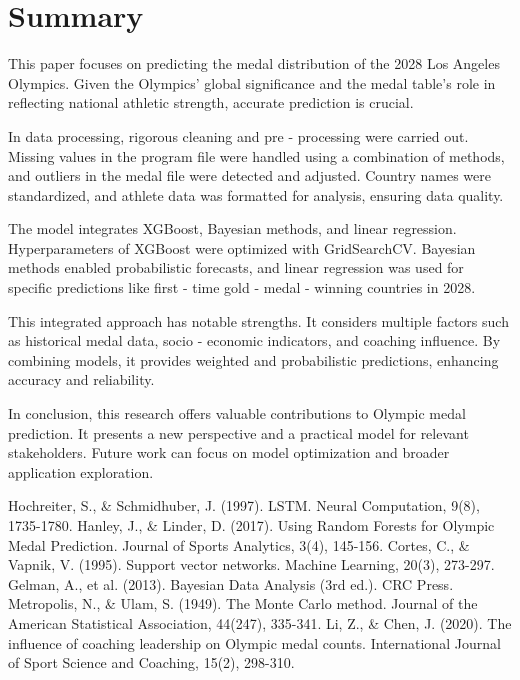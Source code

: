 \documentclass{mcmthesis}
\begin{document}
\section{Summary}
This paper focuses on predicting the medal distribution of the 2028 Los Angeles Olympics. Given the Olympics' global significance and the medal table's role in reflecting national athletic strength, accurate prediction is crucial.

In data processing, rigorous cleaning and pre - processing were carried out. Missing values in the program file were handled using a combination of methods, and outliers in the medal file were detected and adjusted. Country names were standardized, and athlete data was formatted for analysis, ensuring data quality.

The model integrates XGBoost, Bayesian methods, and linear regression. Hyperparameters of XGBoost were optimized with GridSearchCV. Bayesian methods enabled probabilistic forecasts, and linear regression was used for specific predictions like first - time gold - medal - winning countries in 2028.

This integrated approach has notable strengths. It considers multiple factors such as historical medal data, socio - economic indicators, and coaching influence. By combining models, it provides weighted and probabilistic predictions, enhancing accuracy and reliability.

In conclusion, this research offers valuable contributions to Olympic medal prediction. It presents a new perspective and a practical model for relevant stakeholders. Future work can focus on model optimization and broader application exploration.






\begin{thebibliography}{99}
 Hochreiter, S., \& Schmidhuber, J. (1997). LSTM. Neural Computation, 9(8), 1735-1780.
Hanley, J., \& Linder, D. (2017). Using Random Forests for Olympic Medal Prediction. Journal of Sports Analytics, 3(4), 145-156.
Cortes, C., \& Vapnik, V. (1995). Support vector networks. Machine Learning, 20(3), 273-297.
Gelman, A., et al. (2013). Bayesian Data Analysis (3rd ed.). CRC Press.
Metropolis, N., \& Ulam, S. (1949). The Monte Carlo method. Journal of the American Statistical Association, 44(247), 335-341.
Li, Z., \& Chen, J. (2020). The influence of coaching leadership on Olympic medal counts. International Journal of Sport Science and Coaching, 15(2), 298-310.
\end{thebibliography}
\end{document}
